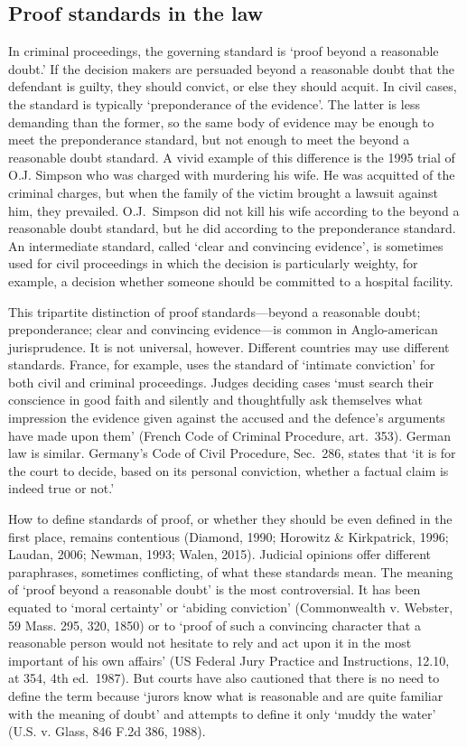 \documentclass[10pt,dvipsnames,enabledeprecatedfontcommands]{scrartcl}
\begin{document}
\subsection{Proof standards in the
law}\label{proof-standards-in-the-law}

In criminal proceedings, the governing standard is `proof beyond a
reasonable doubt.' If the decision makers are persuaded beyond a
reasonable doubt that the defendant is guilty, they should convict, or
else they should acquit. In civil cases, the standard is typically
`preponderance of the evidence'. The latter is less demanding than the
former, so the same body of evidence may be enough to meet the
preponderance standard, but not enough to meet the beyond a reasonable
doubt standard. A vivid example of this difference is the 1995 trial of
O.J. Simpson who was charged with murdering his wife. He was acquitted
of the criminal charges, but when the family of the victim brought a
lawsuit against him, they prevailed. O.J.~Simpson did not kill his wife
according to the beyond a reasonable doubt standard, but he did
according to the preponderance standard. An intermediate standard,
called `clear and convincing evidence', is sometimes used for civil
proceedings in which the decision is particularly weighty, for example,
a decision whether someone should be committed to a hospital facility.

This tripartite distinction of proof standards---beyond a reasonable
doubt; preponderance; clear and convincing evidence---is common in
Anglo-american jurisprudence. It is not universal, however. Different
countries may use different standards. France, for example, uses the
standard of `intimate conviction' for both civil and criminal
proceedings. Judges deciding cases `must search their conscience in good
faith and silently and thoughtfully ask themselves what impression the
evidence given against the accused and the defence's arguments have made
upon them' (French Code of Criminal Procedure, art.~353). German law is
similar. Germany's Code of Civil Procedure, Sec.~286, states that `it is
for the court to decide, based on its personal conviction, whether a
factual claim is indeed true or not.'

How to define standards of proof, or whether they should be even defined
in the first place, remains contentious (Diamond, 1990; Horowitz \&
Kirkpatrick, 1996; Laudan, 2006; Newman, 1993; Walen, 2015). Judicial
opinions offer different paraphrases, sometimes conflicting, of what
these standards mean. The meaning of `proof beyond a reasonable doubt'
is the most controversial. It has been equated to `moral certainty' or
`abiding conviction' (Commonwealth v. Webster, 59 Mass. 295, 320, 1850)
or to `proof of such a convincing character that a reasonable person
would not hesitate to rely and act upon it in the most important of his
own affairs' (US Federal Jury Practice and Instructions, 12.10, at 354,
4th ed.~1987). But courts have also cautioned that there is no need to
define the term because `jurors know what is reasonable and are quite
familiar with the meaning of doubt' and attempts to define it only
`muddy the water' (U.S. v. Glass, 846 F.2d 386, 1988).
\end{document}
